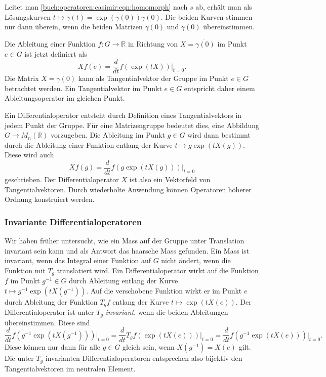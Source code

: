 Leitet man
\eqref{buch:operatoren:casimir:eqn:homomorph}
nach $s$ ab, erhält man als Lösungskurven
\(
t\mapsto \gamma(t) = \exp(\dot{\gamma}(0)) \gamma(0).
\)
Die beiden Kurven stimmen nur dann überein, wenn die beiden Matrizen
$\gamma(0)$ und $\dot{\gamma}(0)$ übereinstimmen.

Die Ableitung einer Funktion $f\colon G\to\mathbb{R}$ in Richtung von
$X=\dot{\gamma(0)}$ im Punkt $e\in G$ ist jetzt definiert als
\[
Xf(e)
=
\frac{d}{dt} f(\exp(tX)) \bigg|_{t=0}.
\]
Die Matrix $X=\dot{\gamma}(0)$ kann als Tangentialvektor der Gruppe
im Punkt $e\in G$ betrachtet werden.
Ein Tangentialvektor im Punkt $e\in G$ entspricht daher einem
Ableitungsoperator im gleichen Punkt.

Ein Differentialoperator entsteht durch Definition eines Tangentialvektors
in jedem Punkt der Gruppe.
Für eine Matrizengruppe bedeutet dies, eine Abbildung $G\to M_n(\mathbb{R})$ 
vorzugeben.
Die Ableitung im Punkt $g\in G$ wird dann bestimmt durch die
Ableitung einer Funktion entlang der Kurve $t\mapsto g\exp(tX(g))$.
Diese wird auch
\[
Xf(g)
=
\frac{d}{dt}f(g\exp(tX(g)))\bigg|_{t=0}
\]
geschrieben.
Der Differentialoperator $X$ ist also ein Vektorfeld von Tangentialvektoren.
Durch wiederholte Anwendung können Operatoren höherer Ordnung konstruiert
werden.

%
%
\subsubsection{Invariante Differentialoperatoren}
Wir haben früher untersucht, wie ein Mass auf der Gruppe unter Translation
invariant sein kann und als Antwort das haarsche Mass gefunden.
Ein Mass ist invariant, wenn das Integral einer Funktion auf $G$ nicht
ändert, wenn die Funktion mit $T_g$ translatiert wird.
Ein Differentialoperator wirkt auf die Funktion $f$ im Punkt $g^{-1}\in G$
durch Ableitung entlang der Kurve $t\mapsto g^{-1}\exp(tX(g^{-1}))$.
Auf die verschobene Funktion wirkt er im Punkt $e$ durch Ableitung
der Funktion $T_gf$ entlang der Kurve $t\mapsto \exp(tX(e))$.
Der Differentialoperator ist unter $T_g$ {\em invariant}, wenn die beiden
Ableitungen übereinstimmen.
Diese sind
\[
\frac{d}{dt} f(g^{-1}\exp(tX(g^{-1}))) \bigg|_{t=0}
=
\frac{d}{dt} T_gf(\exp(tX(e)))\bigg|_{t=0}
=
\frac{d}{dt} f(g^{-1}\exp(tX(e)))\bigg|_{t=0}.
\]
Diese können nur dann für alle $g\in G$ gleich sein, wenn
$X(g^{-1}) = X(e)$ gilt.
Die unter $T_g$ invarianten Differentialoperatoren entsprechen also
bijektiv den Tangentialvektoren im neutralen Element.

